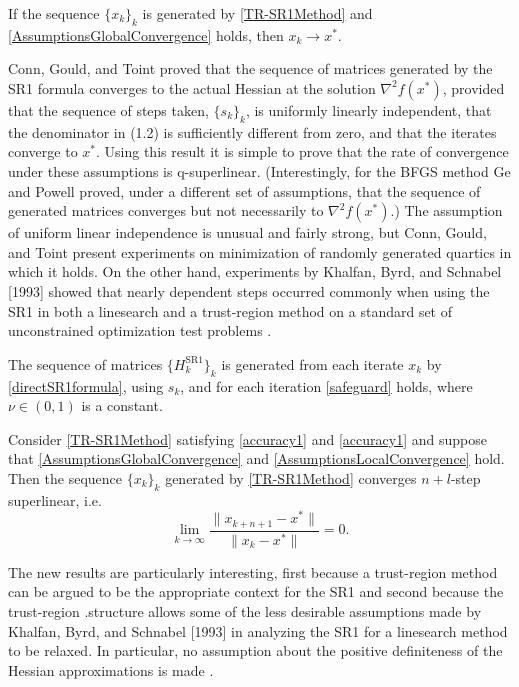 \begin{theorem} \label{GlobalConvergence}
    If the sequence $\{ x_k \}_k$ is generated by \cref{TR-SR1Method} and \cref{AssumptionsGlobalConvergence} holds, then $x_k \rightarrow x^*$.
\end{theorem}




Conn, Gould, and Toint proved that the sequence of matrices generated by the SR1 formula converges to the actual Hessian at the solution $\nabla^2 f(x^*)$, provided that the sequence of steps taken, $\{ s_k \}_k$, is uniformly linearly independent, that the denominator in (1.2) is sufficiently different from zero, and that the iterates converge to $x^*$. Using this result it is simple to prove that the rate of convergence under these assumptions is q-superlinear. (Interestingly, for the BFGS method Ge and Powell proved, under a different set of assumptions, that the sequence of generated matrices converges but not necessarily to $\nabla^2 f(x^*)$.) The assumption of uniform linear independence is unusual and fairly strong, but Conn, Gould, and Toint present experiments on minimization of randomly generated quartics in which it holds. On the other hand, experiments by Khalfan, Byrd, and Schnabel [1993] showed that nearly dependent steps occurred commonly when using the SR1 in both a linesearch and a trust-region method on a standard set of unconstrained optimization test problems \cite[p.~1026]{ByrdKhalfanSchnabel:1996}.


\begin{assumption}\label{AssumptionsLocalConvergence}
    The sequence of matrices $\{ H^{\mathrm{SR1}}_k \}_k$ is generated from each iterate $x_k$ by \cref{directSR1formula}, using $s_k$, and for each iteration \cref{safeguard} holds, where $\nu \in (0, 1)$ is a constant.
\end{assumption}

\begin{theorem} \label{LocalConvergence}
    Consider \cref{TR-SR1Method} satisfying \cref{accuracy1} and \cref{accuracy1} and suppose that \cref{AssumptionsGlobalConvergence} and \cref{AssumptionsLocalConvergence} hold. Then the sequence $\{ x_k \}_k$ generated by \cref{TR-SR1Method} converges $n+l$-step superlinear, i.e. 
    \begin{equation}\label{n+1superlinear}
        \lim_{k \rightarrow \infty} \frac{\lVert x_{k+n+1} - x^* \rVert}{\lVert x_k - x^* \rVert} = 0.
    \end{equation}
\end{theorem}

The new results are particularly interesting, first because a trust-region method can be argued to be the appropriate context for the SR1 and second because the trust-region .structure allows some of the less desirable assumptions made by Khalfan, Byrd, and Schnabel [1993] in analyzing the SR1 for a linesearch method to be relaxed. In particular, no assumption about the positive definiteness of the Hessian approximations is made \cite[p.~1025]{ByrdKhalfanSchnabel:1996}.
